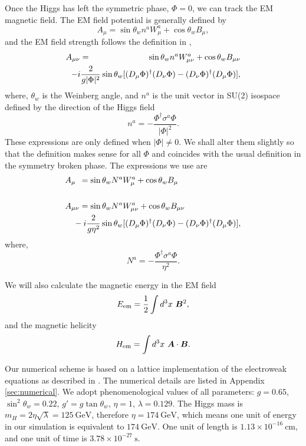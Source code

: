 \documentclass[prd,twocolumn,nofootinbib]{revtex4-1}
\begin{document}
Once the Higgs has left the symmetric phase, $\Phi=0$,
we can track the EM magnetic field. 
The EM field potential is generally defined by
\begin{equation}
A_\mu = \sin \theta_w n^a W^a_\mu + \cos \theta_w B_\mu,
\label{usualAmu}
\end{equation}
and the EM field strength follows the definition in \cite{vachaspati1991magnetic},
\begin{eqnarray}
A_{\mu\nu}&=&\sin \theta_w n^a W^a_{\mu\nu}+\cos\theta_w B_{\mu\nu} \nonumber \\
&& \hskip -1.1 cm
-i \frac{2}{g\vert\Phi\vert^2} \sin\theta_w
[ (D_\mu \Phi )^\dagger (D_\nu \Phi ) - (D_\nu \Phi)^\dagger (D_\mu \Phi)],
\label{usualAmunu}
\end{eqnarray}
where, $\theta_w$ is the Weinberg angle, and $n^a$ is the unit vector in SU(2)
isospace defined by the direction of the Higgs field 
\begin{equation}
n^a = -\frac{\Phi^\dagger \sigma^a \Phi}{\vert \Phi \vert ^2}.
\end{equation}
These expressions are only defined when $| \Phi | \ne 0$. We shall alter them slightly so that the
definition makes sense for all $\Phi$ and coincides with the usual definition in the symmetry
broken phase. The expressions we use are
\begin{align}
	&A_{\mu\hphantom{\nu}} = \sin \theta_w N^a W^a_\mu + \cos \theta_w B_\mu \label{em-field} \\
	& \notag \\
	&A_{\mu\nu}=\sin \theta_w N^a W^a_{\mu\nu}+\cos\theta_w B_{\mu\nu} \notag\\
&  \quad	-i \frac{2}{g\eta^2} \sin\theta_w
 [ (D_\mu \Phi )^\dagger (D_\nu \Phi ) - (D_\nu \Phi)^\dagger (D_\mu \Phi)],
 \label{em-strength}
\end{align}
where, 
\begin{equation}
N^a = -\frac{\Phi^\dagger \sigma^a \Phi}{\eta^2}.
\end{equation}

We will also calculate the magnetic energy in the EM field
\begin{equation}
E_{\rm em} = \frac{1}{2} \int d^3x ~ {\bm B}^2,
\label{mag-energy}
\end{equation}
and the magnetic helicity
\begin{equation}
H_{\rm em} = \int d^3x ~ {\bm A}\cdot {\bm B}.
\label{helicity}
\end{equation}

Our numerical scheme is based on a lattice implementation of the electroweak
equations as described in \cite{rajantie2001electroweak}. The numerical details are listed 
in Appendix \ref{sec:numerical}. 
We adopt phenomenological values of all parameters:
$g=0.65$, $\sin^2\theta_w=0.22$, $g'=g\tan\theta_w$, $\eta=1$, $\lambda=0.129$. 
The Higgs mass is $m_H=2\eta \sqrt{\lambda}=125~\text{GeV}$, therefore $\eta=174~\text{GeV}$, which means 
one unit of energy in our simulation is equivalent to $174~\text{GeV}$. One unit of length is 
$1.13\times 10^{-16} ~\text{cm}$, and one unit of time is $3.78\times10^{-27}~\text{s}$.
\end{document}
